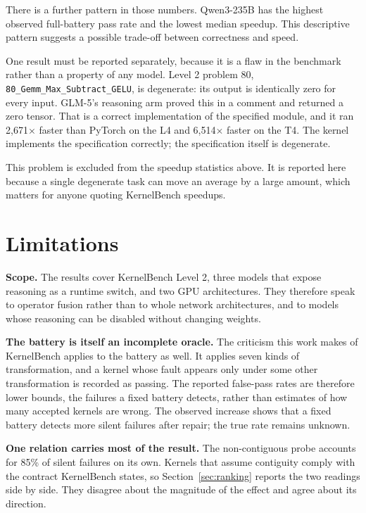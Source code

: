 \documentclass[12pt]{article}
\begin{document}
There is a further pattern in those numbers. Qwen3-235B has the highest
observed full-battery pass rate and the lowest median speedup. This descriptive
pattern suggests a possible trade-off between correctness and speed.

One result must be reported separately, because it is a flaw in the benchmark
rather than a property of any model. Level 2 problem 80,
\texttt{80\_Gemm\_Max\_Subtract\_GELU}, is degenerate: its output is identically
zero for every input. GLM-5's reasoning arm proved this in a comment and
returned a zero tensor. That is a correct implementation of the specified
module, and it ran 2{,}671$\times$ faster than PyTorch on the L4 and
6{,}514$\times$ faster on the T4. The kernel implements the specification
correctly; the specification itself is degenerate.

This problem is excluded from the speedup statistics above. It is reported here
because a single degenerate task can move an average by a large amount, which
matters for anyone quoting KernelBench speedups.

\section{Limitations}
\label{sec:limitations}

\textbf{Scope.} The results cover KernelBench Level 2, three models that expose
reasoning as a runtime switch, and two GPU architectures. They therefore speak
to operator fusion rather than to whole network architectures, and to models
whose reasoning can be disabled without changing weights.

\textbf{The battery is itself an incomplete oracle.} The criticism this work
makes of KernelBench applies to the battery as well. It applies seven kinds of
transformation, and a kernel whose fault appears only under some other
transformation is recorded as passing. The reported false-pass rates are
therefore lower bounds, the failures a fixed battery detects, rather than
estimates of how many accepted kernels are wrong. The observed increase shows that a fixed battery detects
more silent failures after repair; the true rate remains unknown.

\textbf{One relation carries most of the result.} The non-contiguous probe
accounts for 85\% of silent failures on its own. Kernels that assume contiguity
comply with the contract KernelBench states, so Section~\ref{sec:ranking}
reports the two readings side by side. They disagree about the magnitude of the
effect and agree about its direction.
\end{document}
